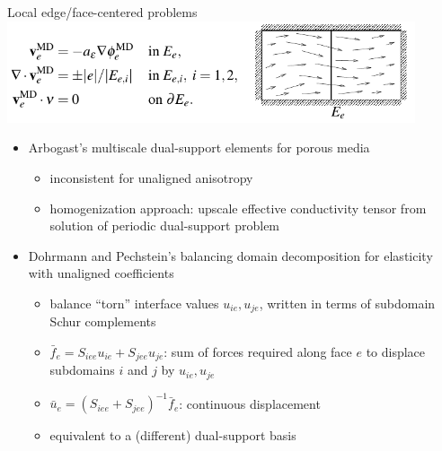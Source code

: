 \begin{frame}{Local edge/face-centered problems}
  \includegraphics[width=0.9\textwidth]{figures/MG/ArbogastMultiscaleDual}
  \begin{itemize}
  \item Arbogast's multiscale dual-support elements for porous media
    \begin{itemize}
    \item inconsistent for unaligned anisotropy
    \item homogenization approach: upscale effective conductivity tensor from solution of periodic dual-support problem
    \end{itemize}
  \item Dohrmann and Pechstein's balancing domain decomposition for elasticity with unaligned coefficients
    \begin{itemize}
    \item balance ``torn'' interface values $u_{ie},u_{je}$, written in terms of subdomain Schur complements
    \item $\bar f_e = S_{iee} u_{ie} + S_{jee} u_{je}$: sum of forces required along face $e$ to displace subdomains $i$ and $j$ by $u_{ie}, u_{je}$
    \item $\bar u_e = (S_{iee} + S_{jee})^{-1} \bar f_e$: continuous displacement
    \item equivalent to a (different) dual-support basis
    \end{itemize}
  \end{itemize}
\end{frame}
